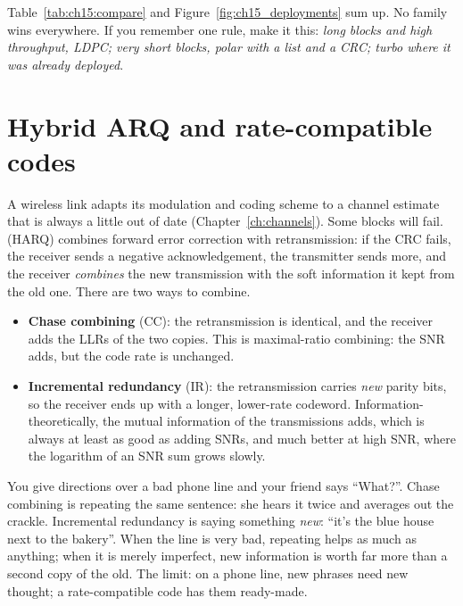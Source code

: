 Table~\ref{tab:ch15:compare} and Figure~\ref{fig:ch15_deployments} sum up. No family wins
everywhere. If you remember one rule, make it this: \emph{long blocks and high throughput, LDPC;
very short blocks, polar with a list and a CRC; turbo where it was already deployed}.

\section{Hybrid ARQ and rate-compatible codes}
\label{sec:ch15:harq}

A wireless link adapts its modulation and coding scheme to a channel estimate that is always a little
out of date (Chapter~\ref{ch:channels}). Some blocks will fail.  (HARQ) combines forward error correction with retransmission: if the CRC fails, the receiver
sends a negative acknowledgement, the transmitter sends more, and the receiver \emph{combines} the
new transmission with the soft information it kept from the old one. There are two ways to combine.
\begin{itemize}
\item \textbf{Chase combining} (CC): the retransmission is identical, and the receiver adds the LLRs
of the two copies. This is maximal-ratio combining: the SNR adds, but the code rate is unchanged.
\item \textbf{Incremental redundancy} (IR): the retransmission carries \emph{new} parity bits, so the
receiver ends up with a longer, lower-rate codeword. Information-theoretically, the mutual
information of the transmissions adds, which is always at least as good as adding SNRs, and much
better at high SNR, where the logarithm of an SNR sum grows slowly.
\end{itemize}


\begin{analogy}
You give directions over a bad phone line and your friend says ``What?''. Chase combining is
repeating the same sentence: she hears it twice and averages out the crackle. Incremental redundancy
is saying something \emph{new}: ``it's the blue house next to the bakery''. When the line is very
bad, repeating helps as much as anything; when it is merely imperfect, new information is worth far
more than a second copy of the old. The limit: on a phone line, new phrases need new thought; a
rate-compatible code has them ready-made.
\end{analogy}

